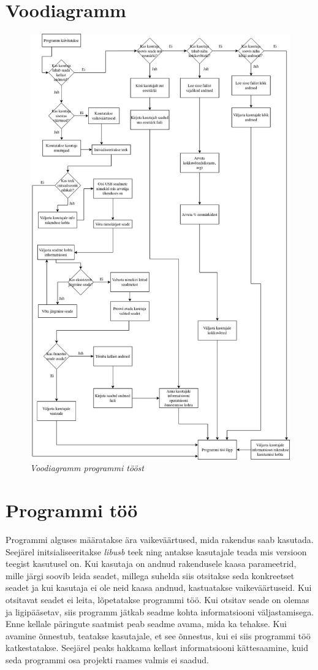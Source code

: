 \section{Voodiagramm}
\begin{figure}[ht]
    \centering
    \includegraphics[width=.7\textwidth]{figures/flowchart.jpg}
    \caption{\textit{Voodiagramm programmi tööst}}
    \label{fig:flowchart}
\end{figure}


\section{Programmi töö}\label{sec:programmi-too}
Programmi alguses määratakse ära vaikeväärtused, mida rakendus saab kasutada.
Seejärel initsialiseeritakse \textit{libusb} teek ning antakse kasutajale teada mis versioon teegist kasutusel on.
Kui kasutaja on andnud rakendusele kaasa parameetrid, mille järgi soovib leida seadet, millega suhelda siis otsitakse seda konkreetset seadet ja kui kasutaja ei ole neid kaasa andnud, kastuatakse vaikeväärtuseid.
Kui otsitavat seadet ei leita, lõpetatakse programmi töö.
Kui otsitav seade on olemas ja ligipääsetav, siis programm jätkab seadme kohta informatsiooni väljastamisega.
Enne kellale päringute saatmist peab seadme avama, mida ka tehakse.
Kui avamine õnnestub, teatakse kasutajale, et see õnnestus, kui ei siis programmi töö katkestatakse.
Seejärel peaks hakkama kellast informatsiooni kättesaamine, kuid seda programmi osa projekti raames valmis ei saadud.

